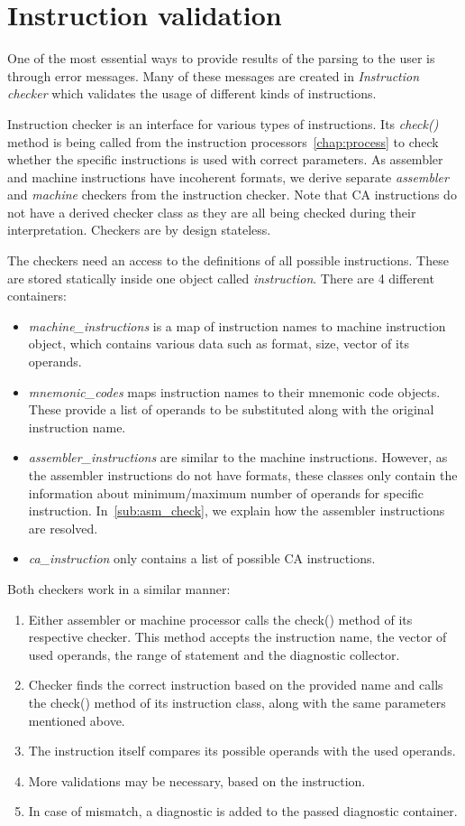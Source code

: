 \section{Instruction validation}

One of the most essential ways to provide results of the parsing to the user is through error messages. Many of these messages are created in \emph{Instruction checker} which validates the usage of different kinds of instructions.

Instruction checker is an interface for various types of instructions. Its \emph{check()} method is being called from the instruction processors~\ref{chap:process} to check whether the specific instructions is used with correct parameters. As assembler and machine instructions have incoherent formats, we derive separate \emph{assembler} and \emph{machine} checkers from the instruction checker. Note that CA instructions do not have a derived checker class as they are all being checked during their interpretation. Checkers are by design stateless.

The checkers need an access to the definitions of all possible instructions. These are stored statically inside one object called \emph{instruction}. There are 4 different containers:
\begin{itemize}
	\item \emph{machine\_instructions} is a map of instruction names to machine instruction object, which contains various data such as format, size, vector of its operands.
	\item \emph{mnemonic\_codes} maps instruction names to their mnemonic code objects. These provide a list of operands to be substituted along with the original instruction name.
	\item \emph{assembler\_instructions} are similar to the machine instructions. However, as the assembler instructions do not have formats, these classes only contain the information about minimum/maximum number of operands for specific instruction. In~\cref{sub:asm_check}, we explain how the assembler instructions are resolved.
	\item \emph{ca\_instruction} only contains a list of possible CA instructions.
\end{itemize}

Both checkers work in a similar manner:
\begin{enumerate}
	\item Either assembler or machine processor calls the check() method of its respective checker. This method accepts the instruction name, the vector of used operands, the range of statement and the diagnostic collector.
	\item Checker finds the correct instruction based on the provided name and calls the check() method of its instruction class, along with the same parameters mentioned above.
	\item The instruction itself compares its possible operands with the used operands.
	\item More validations may be necessary, based on the instruction.
	\item In case of mismatch, a diagnostic is added to the passed diagnostic container.
\end{enumerate}

